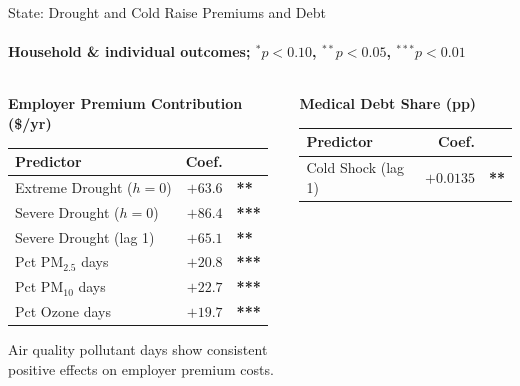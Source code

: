 \documentclass[aspectratio=169,11pt]{beamer}
\newcommand{\emphcolor}[1]{{\color{WarmOrange}\textbf{#1}}}
\newcommand{\tealtext}[1]{{\color{Teal}#1}}
\newcommand{\graytext}[1]{{\color{WarmGray}#1}}
\begin{document}
\begin{frame}{State: Drought and Cold Raise Premiums and Debt}
  \framesubtitle{Household \& individual outcomes; $^{*}p{<}0.10$, $^{**}p{<}0.05$, $^{***}p{<}0.01$}
  \small
  \begin{columns}[T]
    \begin{column}{0.50\textwidth}
      \tealtext{\textbf{Employer Premium Contribution (\$/yr)}}\\[0.25em]
      \begin{tabular}{lrl}
        \toprule
        Predictor & Coef. & \\
        \midrule
        Extreme Drought ($h{=}0$)  & $+63.6$  & \emphcolor{**}  \\
        Severe Drought ($h{=}0$)   & $+86.4$  & \emphcolor{***} \\
        Severe Drought (lag 1)     & $+65.1$  & \emphcolor{**}  \\
        Pct PM$_{2.5}$ days        & $+20.8$  & \emphcolor{***} \\
        Pct PM$_{10}$ days         & $+22.7$  & \emphcolor{***} \\
        Pct Ozone days             & $+19.7$  & \emphcolor{***} \\
        \bottomrule
      \end{tabular}
      \vspace{0.4em}
      \graytext{\scriptsize Air quality pollutant days show consistent\\positive effects on employer premium costs.}
    \end{column}
    \begin{column}{0.46\textwidth}
      \tealtext{\textbf{Medical Debt Share (pp)}}\\[0.25em]
      \begin{tabular}{lrl}
        \toprule
        Predictor & Coef. & \\
        \midrule
        Cold Shock (lag 1) & $+0.0135$ & \emphcolor{**} \\
        \bottomrule
      \end{tabular}
      \vspace{0.5em}


\end{column}
\end{columns}
\end{frame}
\end{document}
